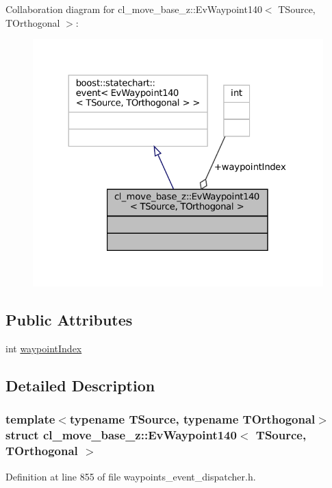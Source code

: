 Collaboration diagram for cl\+\_\+move\+\_\+base\+\_\+z\+:\+:Ev\+Waypoint140$<$ T\+Source, T\+Orthogonal $>$\+:
\nopagebreak
\begin{figure}[H]
\begin{center}
\leavevmode
\includegraphics[width=324pt]{structcl__move__base__z_1_1EvWaypoint140__coll__graph}
\end{center}
\end{figure}
\subsection*{Public Attributes}
\begin{DoxyCompactItemize}
\item 
int \hyperlink{structcl__move__base__z_1_1EvWaypoint140_a4a579969b1d0569cbc4e31986c1e674f}{waypoint\+Index}
\end{DoxyCompactItemize}


\subsection{Detailed Description}
\subsubsection*{template$<$typename T\+Source, typename T\+Orthogonal$>$\newline
struct cl\+\_\+move\+\_\+base\+\_\+z\+::\+Ev\+Waypoint140$<$ T\+Source, T\+Orthogonal $>$}



Definition at line 855 of file waypoints\+\_\+event\+\_\+dispatcher.\+h.



